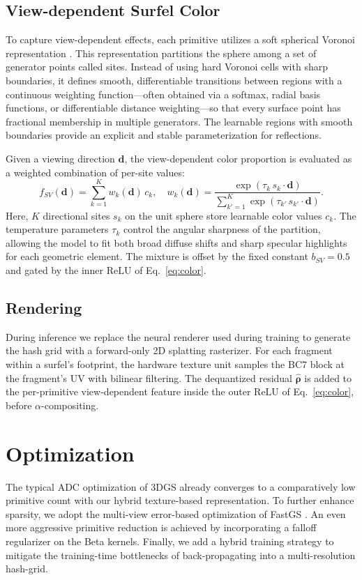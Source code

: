 \documentclass[acmtog,anonymous,review]{acmart}
\begin{document}
\subsection{View-dependent Surfel Color}

To capture view-dependent effects, each primitive utilizes a soft spherical Voronoi representation \cite{TODO_spherical_voronoi_citation}. This representation partitions the sphere among a set of generator points called sites. Instead of using hard Voronoi cells with sharp boundaries, it defines smooth, differentiable transitions between regions with a continuous weighting function---often obtained via a softmax, radial basis functions, or differentiable distance weighting---so that every surface point has fractional membership in multiple generators.
The learnable regions with smooth boundaries provide an explicit and stable parameterization for reflections.

Given a viewing direction $\mathbf{d}$, the view-dependent color proportion is evaluated
as a weighted combination of per-site values: \begin{equation}
f_{SV}(\mathbf{d}) = \sum_{k=1}^{K} w_k(\mathbf{d})\, c_k,
\quad w_k(\mathbf{d}) = \frac{\exp(\tau_k\, s_k \cdot \mathbf{d})}{\sum_{k'=1}^{K}
\exp(\tau_{k'}\, s_{k'} \cdot \mathbf{d})}.
\end{equation} Here, $K$ directional
sites $s_k$ on the unit sphere store learnable color values $c_k$. The temperature
parameters $\tau_k$ control the angular sharpness of the partition, allowing the
model to fit both broad diffuse shifts and sharp specular highlights for each
geometric element. The mixture is offset by the fixed constant $b_{SV}=0.5$ and
gated by the inner $\mathrm{ReLU}$ of Eq.~\ref{eq:color}.

\subsection{Rendering}

During inference we replace the neural renderer used during training to generate the hash grid with a forward-only 2D splatting rasterizer. For each fragment within a surfel's footprint, the hardware texture unit samples the BC7 block at the fragment's UV with bilinear filtering. The dequantized residual $\hat{\boldsymbol{\rho}}$ is added to the per-primitive view-dependent feature inside the outer $\mathrm{ReLU}$ of Eq.~\ref{eq:color}, before $\alpha$-compositing.

\section{Optimization}
The typical ADC optimization of 3DGS already converges to a comparatively low primitive count with our hybrid texture-based representation. To further enhance sparsity, we adopt the multi-view error-based optimization of FastGS \cite{TODO_fastgs_citation}. An even more aggressive primitive reduction is achieved by incorporating a falloff regularizer on the Beta kernels.
Finally, we add a hybrid training strategy to mitigate the training-time bottlenecks of back-propagating into a multi-resolution hash-grid.
\end{document}
